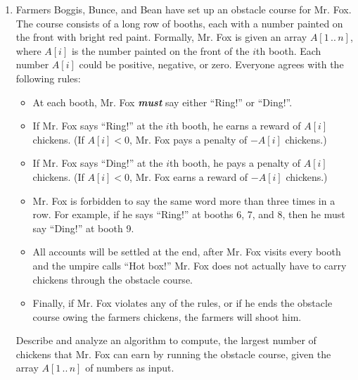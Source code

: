 \begin{enumerate}[label=\arabic*.,ref=\thechapter.\arabic*,leftmargin=*,align=left,widest*=99,itemsep=1.5ex plus 0.5ex]
\item Farmers Boggis, Bunce, and Bean have set up an obstacle course for Mr. Fox.
The course consists of a long row of booths, each with a number painted on the front with bright red paint.
Formally, Mr. Fox is given an array $A[1\,..\,n]$, where $A[i]$ is the number painted on the front of the $i$th booth.
Each number $A[i]$ could be positive, negative, or zero.
Everyone agrees with the following rules:
\begin{itemize}
\item At each booth, Mr. Fox \textbf{\textit{must}} say either “Ring!” or “Ding!”.
\item If Mr. Fox says “Ring!” at the $i$th booth, he earns a reward of $A[i]$ chickens.
(If $A[i] < 0$, Mr. Fox pays a penalty of $-A[i]$ chickens.)
\item If Mr. Fox says “Ding!” at the $i$th booth, he pays a penalty of $A[i]$ chickens.
(If $A[i] < 0$, Mr. Fox earns a reward of $-A[i]$ chickens.)
\item Mr. Fox is forbidden to say the same word more than three times in a row.
For example, if he says “Ring!” at booths 6, 7, and 8, then he must say “Ding!” at booth 9.
\item All accounts will be settled at the end, after Mr. Fox visits every booth and the umpire calls “Hot box!”
Mr. Fox does not actually have to carry chickens through the obstacle course.
\item Finally, if Mr. Fox violates any of the rules, or if he ends the obstacle course owing the farmers chickens, the farmers will shoot him.
\end{itemize}
Describe and analyze an algorithm to compute, the largest number of chickens that Mr. Fox can earn by running the obstacle course, given the array $A[1\,..\,n]$ of numbers as input.





\end{enumerate}
